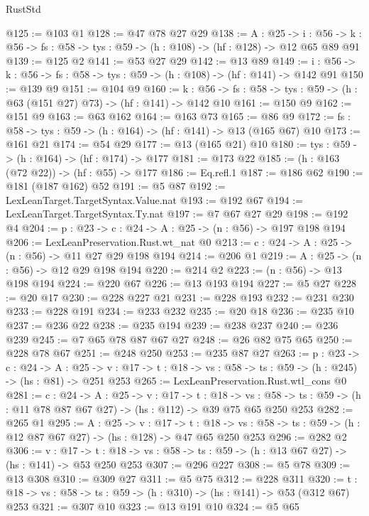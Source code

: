 \begin{lexlean}{RustStd}
\begin{coremodule}
{\begin{coremodule}
{@125 := @103 @1
@128 := @47 @78 @27 @29
@138 := {A : @25} ->
  {i : @56} ->
  {k : @56} -> {fs : @58} -> {tys : @59} -> (h : @108) -> (hf : @128) -> @12 @65 @89 @91
@139 := @125 @2
@141 := @53 @27 @29
@142 := @13 @89
@149 := {i : @56} -> {k : @56} -> {fs : @58} -> {tys : @59} -> (h : @108) -> (hf : @141) -> @142 @91
@150 := @139 @9
@151 := @104 @9
@160 := {k : @56} ->
  {fs : @58} -> {tys : @59} -> (h : @63 (@151 @27) @73) -> (hf : @141) -> @142 @10
@161 := @150 @9
@162 := @151 @9
@163 := @63 @162
@164 := @163 @73
@165 := @86 @9
@172 := {fs : @58} -> {tys : @59} -> (h : @164) -> (hf : @141) -> @13 (@165 @67) @10
@173 := @161 @21
@174 := @54 @29
@177 := @13 (@165 @21) @10
@180 := {tys : @59} -> (h : @164) -> (hf : @174) -> @177
@181 := @173 @22
@185 := (h : @163 (@72 @22)) -> (hf : @55) -> @177
@186 := Eq.refl.{1}
@187 := @186 @62
@190 := @181 (@187 @162) @52
@191 := @5 @87
@192 := LexLeanTarget.TargetSyntax.Value.nat
@193 := @192 @67
@194 := LexLeanTarget.TargetSyntax.Ty.nat
@197 := @7 @67 @27 @29
@198 := @192 @4
@204 := {p : @23} -> {c : @24} -> {A : @25} -> (n : @56) -> @197 @198 @194
@206 := LexLeanPreservation.Rust.wt_nat @0
@213 := {c : @24} -> {A : @25} -> (n : @56) -> @11 @27 @29 @198 @194
@214 := @206 @1
@219 := {A : @25} -> (n : @56) -> @12 @29 @198 @194
@220 := @214 @2
@223 := (n : @56) -> @13 @198 @194
@224 := @220 @67
@226 := @13 @193 @194
@227 := @5 @27
@228 := @20 @17
@230 := @228 @227 @21
@231 := @228 @193
@232 := @231 @230
@233 := @228 @191
@234 := @233 @232
@235 := @20 @18
@236 := @235 @10
@237 := @236 @22
@238 := @235 @194
@239 := @238 @237
@240 := @236 @239
@245 := @7 @65 @78 @87 @67 @27
@248 := @26 @82 @75 @65
@250 := @228 @78 @67
@251 := @248 @250
@253 := @235 @87 @27
@263 := {p : @23} ->
  {c : @24} ->
  {A : @25} ->
  {v : @17} -> {t : @18} -> {vs : @58} -> {ts : @59} -> (h : @245) -> (hs : @81) -> @251 @253
@265 := LexLeanPreservation.Rust.wtl_cons @0
@281 := {c : @24} ->
  {A : @25} ->
  {v : @17} ->
  {t : @18} ->
  {vs : @58} -> {ts : @59} -> (h : @11 @78 @87 @67 @27) -> (hs : @112) -> @39 @75 @65 @250 @253
@282 := @265 @1
@295 := {A : @25} ->
  {v : @17} ->
  {t : @18} -> {vs : @58} -> {ts : @59} -> (h : @12 @87 @67 @27) -> (hs : @128) -> @47 @65 @250 @253
@296 := @282 @2
@306 := {v : @17} ->
  {t : @18} -> {vs : @58} -> {ts : @59} -> (h : @13 @67 @27) -> (hs : @141) -> @53 @250 @253
@307 := @296 @227
@308 := @5 @78
@309 := @13 @308
@310 := @309 @27
@311 := @5 @75
@312 := @228 @311
@320 := {t : @18} -> {vs : @58} -> {ts : @59} -> (h : @310) -> (hs : @141) -> @53 (@312 @67) @253
@321 := @307 @10
@323 := @13 @191 @10
@324 := @5 @65
}
\end{coremodule}}
\end{coremodule}
\end{lexlean}
